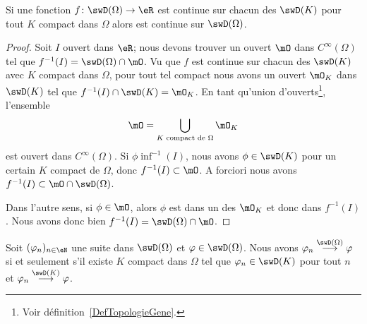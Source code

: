 \begin{lemma}   \label{LemWEGpemo}
    Si une fonction \( f\colon \swD(\Omega)\to \eR\) est continue sur chacun des \( \swD(K)\) pour tout \( K\) compact dans \( \Omega\) alors est continue sur \( \swD(\Omega)\).
\end{lemma}

\begin{proof}
    Soit \( I\) ouvert dans \( \eR\); nous devons trouver un ouvert \( \mO\) dans \(  C^{\infty}(\Omega)\) tel que \( f^{-1}(I)=\swD(\Omega)\cap\mO\). Vu que \( f\) est continue sur chacun des \( \swD(K)\) avec \( K\) compact dans \( \Omega\), pour tout tel compact nous avons un ouvert \( \mO_K\) dans \( \swD(K)\) tel que \( f^{-1}(I)\cap \swD(K)=\mO_K\). En tant qu'union d'ouverts\footnote{Voir définition~\ref{DefTopologieGene}.}, l'ensemble
    \begin{equation}
        \mO=\bigcup_{ K\text{ compact de } \Omega}\mO_K
    \end{equation}
    est ouvert dans \(  C^{\infty}(\Omega)\). Si \( \phi\inf^{-1}(I)\), nous avons \( \phi\in\swD(K)\) pour un certain \( K\) compact de \( \Omega\), donc \( f^{-1}(I)\subset\mO\). A forciori nous avons \( f^{-1}(I)\subset\mO\cap\swD(\Omega)\).

    Dans l'autre sens, si \( \phi\in\mO\), alors \( \phi\) est dans un des \( \mO_K\) et donc dans \( f^{-1}(I)\). Nous avons donc bien \( f^{-1}(I)=\swD(\Omega)\cap \mO\).
\end{proof}

\begin{theorem}       \label{ThoXYADBZr}
    Soit \( (\varphi_n)_{n\in \eN}\) une suite dans \( \swD(\Omega)\) et \( \varphi\in\swD(\Omega)\). Nous avons \( \varphi_n\stackrel{\swD(\Omega)}{\longrightarrow}\varphi\) si et seulement s'il existe \( K\) compact dans \( \Omega\) tel que \( \varphi_n\in\swD(K)\) pour tout \( n\) et \( \varphi_n\stackrel{\swD(K)}{\longrightarrow}\varphi\).
\end{theorem}

